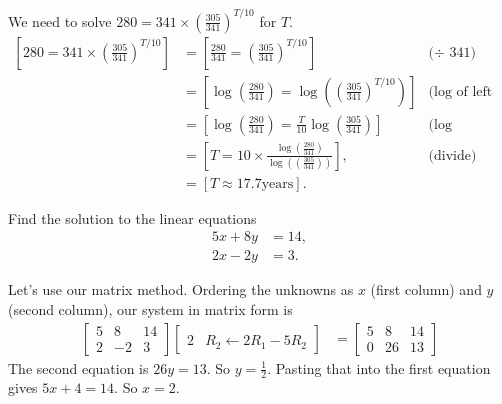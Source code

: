 \documentclass[12pt,fleqn,answers]{exam}
\begin{document}
\begin{questions}
\begin{parts}
\begin{solution}%
   We need to solve $280 = 341 \times \left(\frac{305}{341} \right)^{T/10}$ for $T$.
   \begin{align*}
   \left[280 = 341 \times \left(\frac{305}{341} \right)^{T/10} \right] &=
   \left[\frac{280}{341} = \left(\frac{305}{341} \right)^{T/10} \right] &\mbox{($\div$ 341)} \\
   &= \left[\log(\frac{280}{341}) = \log \left(\left(\frac{305}{341} \right)^{T/10} \right) \right] &\mbox{(log of left and right)} \\
   &= \left[\log \left (\frac{280}{341} \right) = \frac{T}{10} \log \left(\frac{305}{341}  \right) \right] &\mbox{(log property)} \\
   &= \left[T = 10 \times \frac{\log \left (\frac{280}{341} \right)}{\log \left (\left(\frac{305}{341} \right) \right)} \right], &\mbox{(divide)} \\
   &= \left[T \approx 17.7 \mbox{years} \right]. 
   \end{align*}

\end{solution}

\end{parts}



\question [2]  Find the solution to the linear equations
\begin{align*}
   5 x + 8 y &= 14, \\
   2 x - 2 y &= 3.
\end{align*}

\begin{solution}[3.0in] Let's use our matrix method. Ordering the unknowns as $x$  (first column) and $y$ (second column), 
   our system in matrix form is
   \begin{align*}
       \begin{bmatrix} 5 & 8 & 14 \\ 2 & -2 & 3 \end{bmatrix}
       \begin{bmatrix}  \\ 2 & R_2 \leftarrow 2 R_1 - 5 R_2 \end{bmatrix}
       &= \begin{bmatrix} 5 & 8 & 14 \\ 0 & 26 & 13 \end{bmatrix}
   \end{align*}
   The second equation is $26 y = 13$. So $y=\frac{1}{2}$. Pasting that into the 
   first equation gives $5 x + 4 = 14$. So $x =2$. 


\end{solution}
\end{questions}
\end{document}
